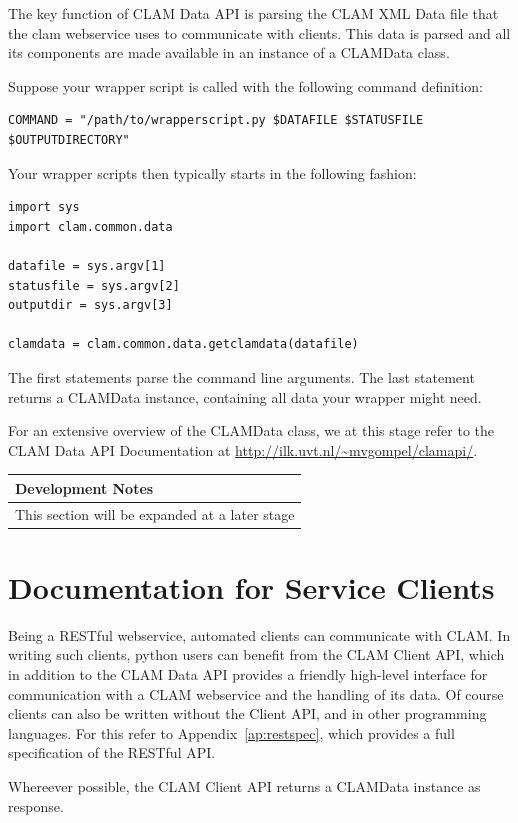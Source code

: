 \documentclass[a4paper,12pt]{report}
\newenvironment{devnotes}
{\newpage
\begin{center}
    \begin{tabular}[h!]{|p{0.8\textwidth}|}
    \hline
    {\bf Development Notes}\\\hline}
{   \\\hline
    \end{tabular}
\end{center}}
\begin{document}
The key function of CLAM Data API is parsing the CLAM XML Data file that the clam webservice uses to communicate with clients. This data is parsed and all its components are made available in an instance of a CLAMData class.

Suppose your wrapper script is called with the following command definition:

\begin{verbatim}
COMMAND = "/path/to/wrapperscript.py $DATAFILE $STATUSFILE $OUTPUTDIRECTORY" 
\end{verbatim}


Your wrapper scripts then typically starts in the following fashion:


\begin{verbatim}
import sys
import clam.common.data

datafile = sys.argv[1]
statusfile = sys.argv[2]
outputdir = sys.argv[3]

clamdata = clam.common.data.getclamdata(datafile)
\end{verbatim}

The first statements parse the command line arguments. The last statement returns a CLAMData instance, containing all data your wrapper might need.

For an extensive overview of the CLAMData class, we at this stage refer to the CLAM Data API Documentation at \url{http://ilk.uvt.nl/~mvgompel/clamapi/}.

\begin{devnotes}
This section will be expanded at a later stage
\end{devnotes}


\chapter{Documentation for Service Clients}

Being a RESTful webservice, automated clients can communicate with CLAM. In writing such clients, python users can benefit from the CLAM Client API, which in addition to the CLAM Data API provides a friendly high-level interface for communication with a CLAM webservice and the handling of its data. Of course clients can also be written without the Client API, and in other programming languages. For this refer to Appendix~\ref{ap:restspec}, which provides a full specification of the RESTful API.

Whereever possible, the CLAM Client API returns a CLAMData instance as response.
\end{document}
